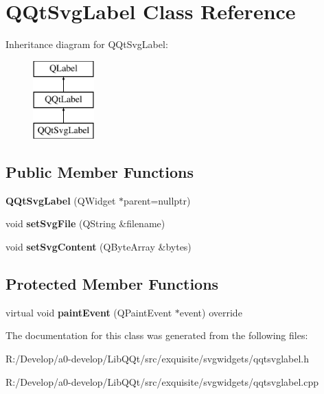 \hypertarget{class_q_qt_svg_label}{}\section{Q\+Qt\+Svg\+Label Class Reference}
\label{class_q_qt_svg_label}
Inheritance diagram for Q\+Qt\+Svg\+Label\+:\begin{figure}[H]
\begin{center}
\leavevmode
\includegraphics[height=3.000000cm]{class_q_qt_svg_label}
\end{center}
\end{figure}
\subsection*{Public Member Functions}
\begin{DoxyCompactItemize}
\item 
\mbox{\label{class_q_qt_svg_label_abc66da7a8c89a6f474b592fbc068e9a3}} 
{\bfseries Q\+Qt\+Svg\+Label} (Q\+Widget $\ast$parent=nullptr)
\item 
\mbox{\label{class_q_qt_svg_label_a5ca385316254b2e5ccfda073ac9a2957}} 
void {\bfseries set\+Svg\+File} (Q\+String \&filename)
\item 
\mbox{\label{class_q_qt_svg_label_a2dce865332deae947be916408310c5b7}} 
void {\bfseries set\+Svg\+Content} (Q\+Byte\+Array \&bytes)
\end{DoxyCompactItemize}
\subsection*{Protected Member Functions}
\begin{DoxyCompactItemize}
\item 
\mbox{\label{class_q_qt_svg_label_adb1742a16d6672cfb2f89d13a1bb0249}} 
virtual void {\bfseries paint\+Event} (Q\+Paint\+Event $\ast$event) override
\end{DoxyCompactItemize}


The documentation for this class was generated from the following files\+:\begin{DoxyCompactItemize}
\item 
R\+:/\+Develop/a0-\/develop/\+Lib\+Q\+Qt/src/exquisite/svgwidgets/qqtsvglabel.\+h\item 
R\+:/\+Develop/a0-\/develop/\+Lib\+Q\+Qt/src/exquisite/svgwidgets/qqtsvglabel.\+cpp\end{DoxyCompactItemize}
